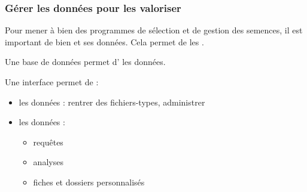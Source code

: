 \begin{frame}
\frametitle{Gérer les données pour les valoriser}

Pour mener à bien des programmes de sélection et de gestion des semences, il est important de bien  et  ses données.
Cela permet de les .

\vfill

Une base de données permet d' les données.

Une interface permet de : 
\begin{itemize}
\item {} les données : rentrer des fichiers-types, administrer
\item {} les données :
\begin{itemize}
\item requêtes
\item analyses
\item fiches et dossiers personnalisés
\end{itemize}
\end{itemize}

\end{frame}

